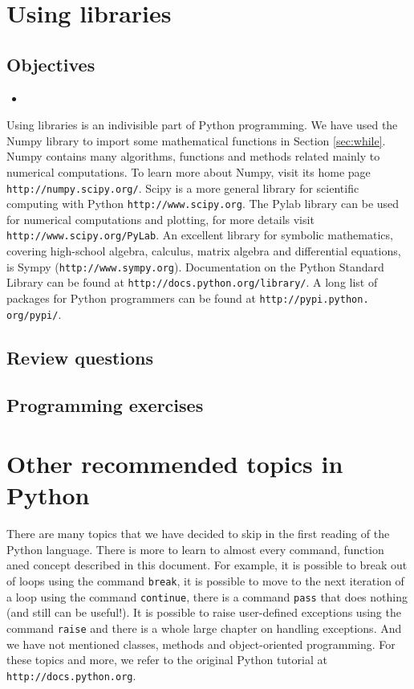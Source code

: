 \section{Using libraries}\label{subsec:importinglib}

\subsection{Objectives}

\begin{itemize}
\item
\end{itemize}

Using libraries is an indivisible part of Python programming. We have 
used the Numpy library to import some mathematical functions in Section 
\ref{sec:while}. Numpy contains many algorithms, functions and methods 
related mainly to numerical computations. To learn more about Numpy,
visit its home page {\tt http://numpy.scipy.org/}. Scipy is a more 
general library for scientific computing with Python {\tt http://www.scipy.org}.
The Pylab library can be used for numerical computations and plotting,
for more details visit {\tt http://www.scipy.org/PyLab}. An excellent 
library for symbolic mathematics, covering high-school algebra, calculus,
matrix algebra and differential equations, is Sympy ({\tt http://www.sympy.org}).
Documentation on the Python Standard Library can be found at 
{\tt http://docs.python.org/library/}. A long list of packages for Python 
programmers can be found at {\tt http://pypi.python. org/pypi/}.

\subsection{Review questions}

\subsection{Programming exercises}


\section{Other recommended topics in Python} \label{sec:adv}

There are many topics that we have decided to skip in the first reading 
of the Python language. There is more to learn to almost every command,
function aned concept described in this document. For example, it is possible
to break out of loops using the command {\tt break}, it is possible to 
move to the next iteration of a loop using the command {\tt continue},
there is a command {\tt pass} that does nothing (and still can be useful!). 
It is possible to 
raise user-defined exceptions using the command {\tt raise} and there
is a whole large chapter on handling exceptions. And we have not 
mentioned classes, methods and object-oriented programming. For these
topics and more, we refer to the original Python tutorial at 
{\tt http://docs.python.org}. 




